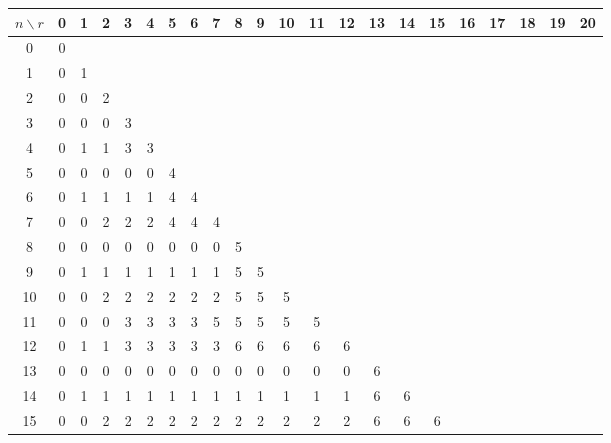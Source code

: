 \documentclass[11pt,twoside]{scrartcl}
\begin{document}
\begin{table}[h]
    \centering
    \begin{tabular}{c|*{21}c}
      $n \backslash r$ & 0 & 1 & 2 & 3 & 4 & 5 & 6 & 7 & 8 & 9 & 10 & 11 & 12 & 13 & 14 & 15 & 16 & 17 & 18 & 19 & 20  \\\hline
    0  & 0 &   &   &   &   &   &   &   &   &   &    &    &    &    &    &    &    &    &    &    &     \\
    1  & 0 & 1 &   &   &   &   &   &   &   &   &    &    &    &    &    &    &    &    &    &    &     \\
    2  & 0 & 0 & 2 &   &   &   &   &   &   &   &    &    &    &    &    &    &    &    &    &    &     \\
    3  & 0 & 0 & 0 & 3 &   &   &   &   &   &   &    &    &    &    &    &    &    &    &    &    &     \\
    4  & 0 & 1 & 1 & 3 & 3 &   &   &   &   &   &    &    &    &    &    &    &    &    &    &    &     \\
    5  & 0 & 0 & 0 & 0 & 0 & 4 &   &   &   &   &    &    &    &    &    &    &    &    &    &    &     \\
    6  & 0 & 1 & 1 & 1 & 1 & 4 & 4 &   &   &   &    &    &    &    &    &    &    &    &    &    &     \\
    7  & 0 & 0 & 2 & 2 & 2 & 4 & 4 & 4 &   &   &    &    &    &    &    &    &    &    &    &    &     \\
    8  & 0 & 0 & 0 & 0 & 0 & 0 & 0 & 0 & 5 &   &    &    &    &    &    &    &    &    &    &    &     \\
    9  & 0 & 1 & 1 & 1 & 1 & 1 & 1 & 1 & 5 & 5 &    &    &    &    &    &    &    &    &    &    &     \\
    10 & 0 & 0 & 2 & 2 & 2 & 2 & 2 & 2 & 5 & 5 & 5  &    &    &    &    &    &    &    &    &    &     \\
    11 & 0 & 0 & 0 & 3 & 3 & 3 & 3 & 5 & 5 & 5 & 5  & 5  &    &    &    &    &    &    &    &    &     \\
    12 & 0 & 1 & 1 & 3 & 3 & 3 & 3 & 3 & 6 & 6 & 6  & 6  & 6  &    &    &    &    &    &    &    &     \\
    13 & 0 & 0 & 0 & 0 & 0 & 0 & 0 & 0 & 0 & 0 & 0  & 0  & 0  & 6  &    &    &    &    &    &    &     \\
    14 & 0 & 1 & 1 & 1 & 1 & 1 & 1 & 1 & 1 & 1 & 1  & 1  & 1  & 6  & 6  &    &    &    &    &    &     \\
    15 & 0 & 0 & 2 & 2 & 2 & 2 & 2 & 2 & 2 & 2 & 2  & 2  & 2  & 6  & 6  & 6  &    &    &    &    &     \\

\end{tabular}
\end{table}
\end{document}
